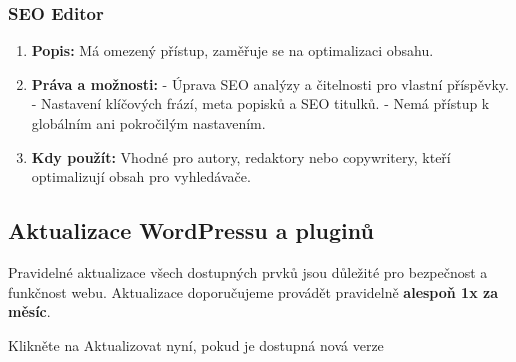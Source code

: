 \documentclass[12pt,a4paper]{article}
\begin{document}
	\subsubsection*{SEO Editor}
	\begin{enumerate}
		\item \textbf{Popis:} Má omezený přístup, zaměřuje se na optimalizaci obsahu.
		\item \textbf{Práva a možnosti:}  
		- Úprava SEO analýzy a čitelnosti pro vlastní příspěvky.  
		- Nastavení klíčových frází, meta popisků a SEO titulků.  
		- Nemá přístup k globálním ani pokročilým nastavením.
		\item \textbf{Kdy použít:} Vhodné pro autory, redaktory nebo copywritery, kteří optimalizují obsah pro vyhledávače.
	\end{enumerate}
	
	\subsection{Aktualizace WordPressu a pluginů}
	Pravidelné aktualizace všech dostupných prvků jsou důležité pro bezpečnost a funkčnost webu. Aktualizace doporučujeme provádět pravidelně \textbf{alespoň 1x za měsíc}.
	
	Klikněte na Aktualizovat nyní, pokud je dostupná nová verze 
	
	
	
	
	
	
\end{document}
